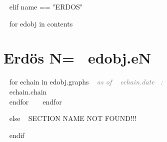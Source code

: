 
%
%



~{ elif name == "ERDOS" }~

~{ for edobj in contents }~
\section{Erdös N=~{{ edobj.eN }}~}
~{ for echain in edobj.graphs }~
\textit{\textcolor{grey}{as of ~{{ echain.date }}~:}}\\
~{{ echain.chain }}~\\

~{ endfor }~
~{ endfor }~


~{ else }~
SECTION NAME NOT FOUND!!!


~{ endif }~


%	





